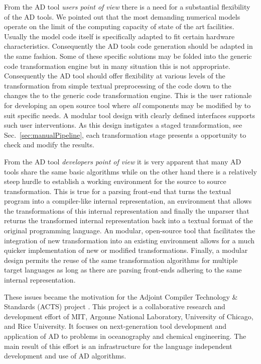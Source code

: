 \documentclass{book}
\newcommand{\refsec}[1]{{Sec.~\ref{#1}}}
\begin{document}
From  the AD tool  {\em users point of view} there is a need for a substantial 
flexibility of the AD tools. 
We pointed out that the most demanding  numerical models 
operate on the limit of the computing capacity of state of the art facilities. 
Usually the model code itself is specifically adapted to fit certain 
hardware characteristics. 
Consequently the AD tools code generation should be adapted in the same fashion. 
Some of these specific solutions may be folded into the generic code transformation engine 
but in many situation this is not appropriate.
Consequently the AD tool should offer flexibility at various levels of the 
transformation from simple textual preprocessing of the code down to the 
changes the to the generic code transformation engine.
This is the user rationale for developing an open source tool where {\em all} 
components may be modified by to suit specific 
needs.  
A modular tool design with clearly defined interfaces supports such 
user interventions. 
As this design instigates a staged 
transformation, see \refsec{sec:manualPipeline}, 
each transformation stage presents a opportunity to check and modify the 
results. 

From the AD tool {\em developers point of view} it is very apparent that 
many AD tools share the same basic algorithms while on the other hand 
there is a relatively steep hurdle to establish a working environment 
for the source to source transformation. 
This is true for a parsing front-end that turns the textual program into a 
compiler-like internal representation, an environment that allows the 
transformations  of this internal representation and finally the unparser that 
returns the transformed internal representation back into a textual format of the 
original programming language. An modular, open-source tool that facilitates 
the integration of new transformation into an existing environment 
allows for a much quicker implementation of new or modified  transformations.
Finally, a modular design permits the reuse of the same transformation algorithms 
for multiple target languages as long as there are parsing front-ends adhering to the 
same internal representation.

These issues became the motivation for the 
Adjoint Compiler Technology \& Standards (ACTS) project \cite{actsWeb}.
This project is a collaborative
research and development effort of MIT, Argonne National Laboratory, 
University of Chicago, and Rice University. 
It focuses on  next-generation tool development and 
application of AD to problems in oceanography and chemical engineering.
The main result of this effort is an infrastructure for the language independent 
development and use of AD algorithms. 
\end{document}

